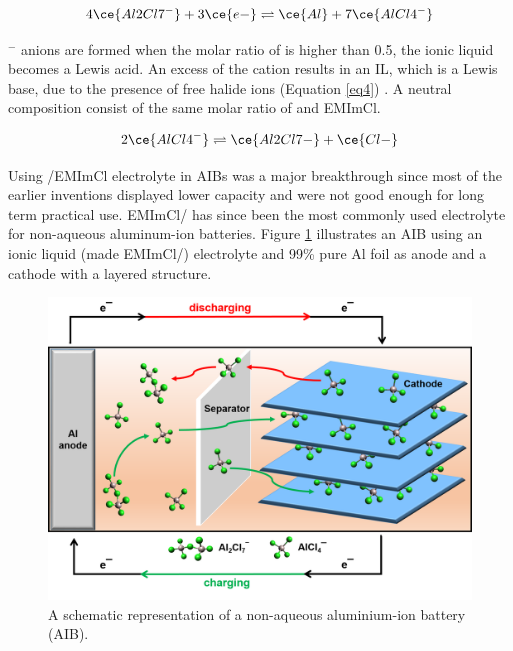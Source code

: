 \begin{align} \label{eq3}
   4\ce{Al2Cl7^{-}} + 3\ce{e-} \rightleftharpoons \ce{Al} + 7\ce{AlCl4^{-}}  
\end{align}

$^-$ anions are formed when the molar ratio of  is higher than 0.5, the ionic liquid becomes a Lewis acid. An excess of the cation results in an IL, which is a Lewis base, due to the presence of free halide ions (Equation \ref{eq4}) \cite{holbrey_ionic_1999}. A neutral composition consist of the same molar ratio of  and EMImCl. 

\begin{align}\label{eq4}
   2\ce{AlCl4^{-}} \rightleftharpoons \ce{Al2Cl7-}+\ce{Cl-} 
\end{align}

Using /EMImCl electrolyte in AIBs was a major breakthrough since most of the earlier inventions displayed lower capacity and were not good enough for long term practical use. EMImCl/  has since been the most commonly used electrolyte for non-aqueous aluminum-ion batteries.
Figure \ref{Figures/chap1fig:AIBmech} illustrates an AIB using an ionic liquid  (made EMImCl/) electrolyte and 99\% pure Al foil as anode and a cathode with a layered structure. 

\begin{figure}[tbh!]
\centering
\includegraphics[width=\textwidth]{Figures/chap1fig/AIBmech}
\caption{A schematic representation of a non-aqueous aluminium-ion battery (AIB).}
\label{Figures/chap1fig:AIBmech}
\end{figure}

